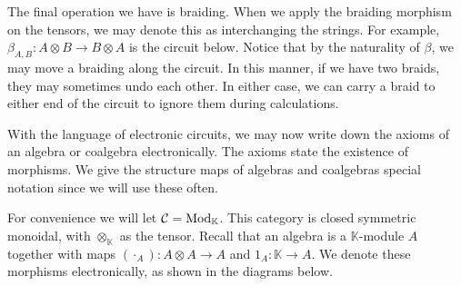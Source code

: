 \documentclass[../thesis.tex]{subfiles}
\begin{document}
            The final operation we have is braiding. When we apply the braiding morphism on the tensors, we may denote this as interchanging the strings. For example, $\beta_{A, B}: A \otimes B \rightarrow B \otimes A$ is the circuit below. Notice that by the naturality of $\beta$, we may move a braiding along the circuit. In this manner, if we have two braids, they may sometimes undo each other. In either case, we can carry a braid to either end of the circuit to ignore them during calculations.
            \begin{center}
            \end{center}

            With the language of electronic circuits, we may now write down the axioms of an algebra or coalgebra electronically. The axioms state the existence of morphisms. We give the structure maps of algebras and coalgebras special notation since we will use these often.

            For convenience we will let $\mathcal{C} = \tt{Mod}_\mathbb{K}$. This category is closed symmetric monoidal, with $\otimes_\mathbb{K}$ as the tensor. Recall that an algebra is a $\mathbb{K}$-module $A$ together with maps $(\cdot_A) : A \otimes A \rightarrow A$ and $1_A : \mathbb{K} \rightarrow A$. We denote these morphisms electronically, as shown in the diagrams below.
            \begin{center}
                \qquad
            \end{center}
\end{document}
